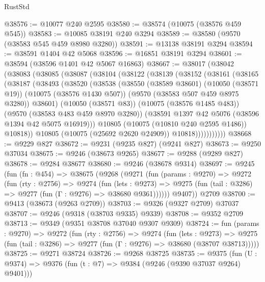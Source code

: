 \begin{lexlean}{RustStd}
\begin{coremodule}
@38576 := @10077 @240 @2595
@38580 := @38574 (@10075 (@38576 @459 @545))
@38583 := @10085 @38191 @240 @3294
@38589 := @38580 (@9570 (@38583 @545 @459 @8980 @3280))
@38591 := @13138 @38191 @3294
@38594 := @38591 @1404 @42 @5068
@38596 := @16851 @38191 @3294
@38601 := @38594 (@38596 @1401 @42 @5067 @16863)
@38667 := @38017
    (@38042
      (@38083
        (@38085
          (@38087
            (@38104
              (@38122
                (@38139
                  (@38152
                    (@38161
                      (@38165
                        (@38187
                          (@38493
                            (@38520
                              (@38538
                                (@38550
                                  (@38589 @38601)
                                  (@10050 (@38571 @19))
                                  (@10075 (@38576 @1430 @507))
                                  (@9570 (@38583 @507 @459 @8975 @3280))
                                  @38601)
                                (@10050 (@38571 @83))
                                (@10075 (@38576 @1485 @483))
                                (@9570 (@38583 @483 @459 @8970 @3280))
                                (@38591 @1397 @42 @5076 (@38596 @1394 @42 @5075 @16919)))
                              @10805
                              (@10075 (@10810 @240 @2595 @1486))
                              @10818))
                          @10805
                          (@10075 (@25692 @2620 @24909))
                          @10818)))))))))))
@38668 := @9229 @827
@38672 := @9231 (@9235 @827) (@9241 @827)
@38673 := @9250 @37034
@38675 := @9246 (@38673 @9265)
@38677 := @9288 (@9289 @827)
@38678 := @9284 @38677
@38680 := @9246 (@38678 @9314)
@38697 := @9245
    (fun (fn : @454) =>
    @38675
      (@9268
        (@9271
          (fun (params : @9270) =>
          @9272
            (fun (rty : @2756) =>
            @9274
              (fun (lets : @9273) =>
              @9275 (fun (tail : @3286) => @9277 (fun (Γ : @9276) => @38680 @9361))))))
        @9407))
    @2709
@38700 := @9413 (@38673 (@9263 @2709))
@38703 := @9326 (@9327 @2709) @37037
@38707 := @9246 (@9318 (@38703 @9335) @9339)
@38708 := @9352 @2709
@38713 := @9349 (@9351 @38708 @37040 @9307 @9309)
@38724 := fun (params : @9270) =>
  @9272
    (fun (rty : @2756) =>
    @9274
      (fun (lets : @9273) =>
      @9275 (fun (tail : @3286) => @9277 (fun (Γ : @9276) => @38680 (@38707 @38713)))))
@38725 := @9271 @38724
@38726 := @9268 @38725
@38735 := @9375
    (fun (U : @9374) => @9376 (fun (t : @7) => @9384 (@9246 (@9390 @37037 @9264) @9401)))

\end{coremodule}
\end{lexlean}
